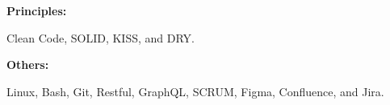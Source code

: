 \documentclass[8pt]{developercv} %
\begin{document}
\begin{minipage}[t]{0.47\textwidth}
        \begin{minipage}[t]{0.14\textwidth}
            \textbf{Principles:}
        \end{minipage}
        \hfill
        \begin{minipage}[t]{0.79\textwidth}
            Clean Code, SOLID, KISS, and DRY\@.
        \end{minipage}
        \vspace{4pt}

        \begin{minipage}[t]{0.14\textwidth}
            \textbf{Others:}
        \end{minipage}
        \hfill
        \begin{minipage}[t]{0.79\textwidth}
            Linux, Bash, Git, Restful, GraphQL, SCRUM, Figma, Confluence, and Jira.
        \end{minipage}
        \vspace{4pt}

    \end{minipage}
\end{document}
